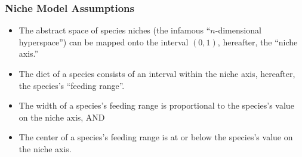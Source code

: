 \documentclass[table]{beamer}
\begin{document}
\begin{frame}
    \frametitle{Niche Model Assumptions}
    \begin{itemize}[<+->]
        \item The abstract space of species niches (the infamous
            ``$n$-dimensional hyperspace'') can be mapped onto the interval
            $(0,1)$, hereafter, the ``niche axis.''
        \item The diet of a species consists of an interval within the niche
            axis, hereafter, the species's ``feeding range''.
        \item The width of a  species's feeding range is proportional to the
            species's value on the niche axis, AND 
        \item The center of a species's feeding range is at or below the
            species's value on the niche axis.
    \end{itemize}
\end{frame}
\end{document}
